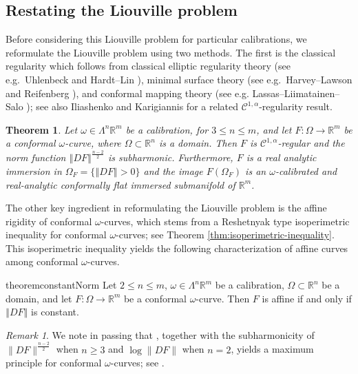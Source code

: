 \documentclass[a4paper,leqno,11pt]{amsart}
\numberwithin{equation}{section}
\newtheorem{theorem}{Theorem}[section]
\theoremstyle{remark}
\newtheorem*{remark*}{Remark}
\theoremstyle{remark}
\newcommand{\R}{\mathbb{R}}
\newcommand{\norm}[1]{ \left\Vert #1 \right\Vert }	%
\begin{document}
\subsection{Restating the Liouville problem}

Before considering this Liouville problem for particular calibrations, we reformulate the Liouville problem using two methods. The first is the classical regularity which follows from classical elliptic regularity theory (see e.g.~Uhlenbeck \cite{Uhl:77} and Hardt--Lin \cite{Har:Lin:87}), minimal surface theory (see e.g.~Harvey--Lawson \cite{Har:Law:82} and Reifenberg \cite{Reif:64}), and conformal mapping theory (see e.g. Lassas--Liimatainen--Salo \cite{Las:Lii:Sal:22}); see also Iliashenko and Karigiannis \cite{Ilia:Karig:23} for a related $\mathcal{C}^{1,\alpha}$-regularity result.

\begin{theorem}\label{thm:realanalytic}
Let $\omega \in \Lambda^n \R^m$ be a calibration, for $3\le n \le m$, and let $F\colon \Omega \to \R^m$ be a conformal $\omega$-curve, where $\Omega \subset \R^n$ is a domain. Then $F$ is $\mathcal{C}^{1,\alpha}$-regular and the norm function $\norm{DF}^{\frac{n-2}{2}}$ is subharmonic. Furthermore, $F$ is a real analytic immersion in $\Omega_F = \{\norm{DF}>0\}$ and the image $F(\Omega_F)$ is an $\omega$-calibrated and real-analytic conformally flat immersed submanifold of $\R^m$.
\end{theorem}


The other key ingredient in reformulating the Liouville problem is the affine rigidity of conformal $\omega$-curves, which stems from a Reshetnyak type isoperimetric inequality for conformal $\omega$-curves; see Theorem \ref{thm:isoperimetric-inequality}. This isoperimetric inequality yields the following characterization of affine curves among conformal $\omega$-curves.
 
\begin{restatable}{theorem}{constantNorm}
\label{thm:constant-norm-means-affine}
Let $2\le n \le m$, $\omega \in \Lambda^n \R^m$ be a calibration, $\Omega \subset \R^n$ be a domain, and let $F\colon \Omega \to \R^m$ be a conformal $\omega$-curve. Then $F$ is affine if and only if $\norm{DF}$ is constant.
\end{restatable}

\begin{remark*}
We note in passing that , together with the subharmonicity of $\|DF\|^{ \frac{n-2}{2} }$ when $n \geq 3$ and $\log \|DF\|$ when $n = 2$, yields a maximum principle for conformal $\omega$-curves; see .
\end{remark*}
\end{document}
